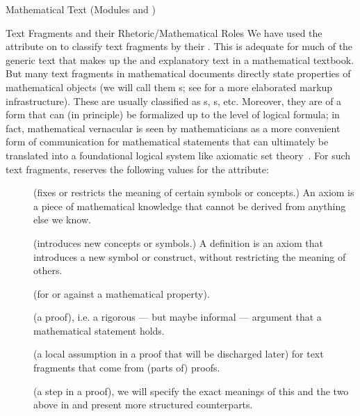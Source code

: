 \begin{tchapter}[id=mtxt,short=Mathematical Text]{Mathematical Text (Modules
  {} and {})}
\begin{tsection}[id=omtext]{Text Fragments and their Rhetoric/Mathematical Roles}
  We have used the {} attribute on {} to classify
  text fragments by their {}. This is adequate for much of the
  generic text that makes up the {} and explanatory text in a
  mathematical textbook. But many text fragments in mathematical documents directly state
  properties of mathematical objects (we will call them
  {s}; see {} for a more elaborated
  markup infrastructure). These are usually classified as {s},
  {s}, etc.  Moreover, they are of a form that can (in principle) be
  formalized up to the level of logical formula; in fact, mathematical vernacular is seen
  by mathematicians as a more convenient form of communication for mathematical statements
  that can ultimately be translated into a foundational logical system like axiomatic set
  theory~\cite{Bernays:ast91}.  For such text fragments, {\omdoc} reserves the following
  values for the {} attribute:
\begin{description}
\item[{}] (fixes or restricts the meaning of certain
  symbols or concepts.) An axiom is a piece of mathematical knowledge that cannot
  be derived from anything else we know.
\item[{}] (introduces new concepts or symbols.) A
  definition is an axiom that introduces a new symbol or construct, without restricting
  the meaning of others.
\item[{}] (for or against a mathematical property).
\item[{}] (a proof), i.e. a rigorous --- but maybe informal
  --- argument that a mathematical statement holds.
\item[{}] (a local assumption in a proof that will be
  discharged later) for text fragments that come from (parts of) proofs.
\item[{}] (a step in a proof), we will specify the exact
  meanings of this and the two above in {} and present more structured
  counterparts.
\end{description} 


\end{tsection}
\end{tchapter}
